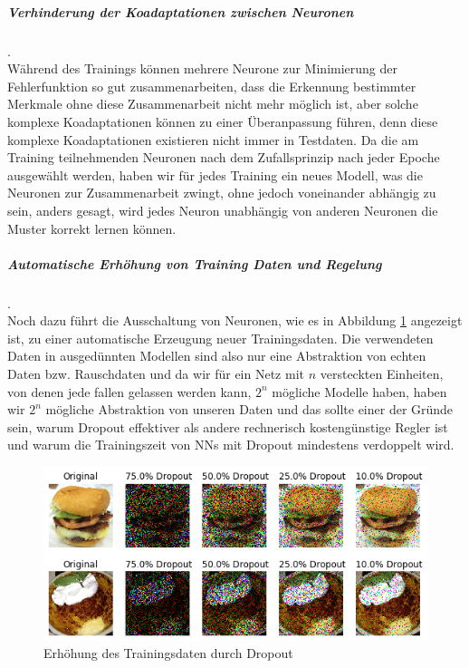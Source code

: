 \documentclass[12pt,a4paper]{scrartcl}
\numberwithin{equation}{section}
\begin{document}
\subparagraph{Verhinderung der Koadaptationen zwischen Neuronen}.\\
Während des Trainings können mehrere Neurone zur Minimierung der Fehlerfunktion so gut zusammenarbeiten, dass die Erkennung bestimmter Merkmale ohne diese Zusammenarbeit nicht mehr möglich ist, aber solche komplexe Koadaptationen  können zu einer Überanpassung führen, denn diese komplexe Koadaptationen existieren nicht immer in Testdaten. Da die am Training teilnehmenden Neuronen nach dem Zufallsprinzip nach jeder Epoche ausgewählt werden, haben wir für jedes Training ein neues Modell, was die Neuronen zur Zusammenarbeit zwingt, ohne jedoch voneinander abhängig zu sein, anders gesagt, wird jedes Neuron unabhängig von anderen Neuronen die Muster korrekt lernen können.  

\subparagraph{Automatische Erhöhung von Training Daten und Regelung }.\\
Noch dazu führt die Ausschaltung von Neuronen, wie es in Abbildung \ref{fig:DropoutDataAugmentation} angezeigt ist, zu einer automatische Erzeugung neuer Trainingsdaten. Die verwendeten Daten in ausgedünnten Modellen sind also nur eine Abstraktion von echten Daten bzw. Rauschdaten und da wir für ein Netz mit $ n $ versteckten Einheiten, von denen jede fallen gelassen werden kann, $ 2^n $ mögliche Modelle haben, haben wir $ 2^n $ mögliche Abstraktion von unseren Daten und das sollte einer der Gründe sein, warum Dropout effektiver als andere rechnerisch kostengünstige Regler ist \cite{3} und warum die Trainingszeit von \acsp{NN} mit Dropout mindestens verdoppelt wird. 

\begin{figure}[h]
	\centering
	\includegraphics{model}
	\caption{Erhöhung des Trainingsdaten durch Dropout}
	\label{fig:DropoutDataAugmentation}
\end{figure}
\end{document}
